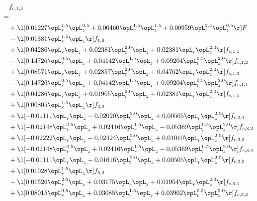 \begin{alignat}{2} 
\label{eq:f_13_1} 
& f_{c,1,3} \nonumber \\ 
 = \\ 
& + \l[  0.01227 \opL_r^{1.5} \opL_z^{0.5} +  0.00460 \opL_r^{1.5} \opL_z^{1.5} +  0.00959 \opL_r^{2.5} \opL_z^{0.5}  \r] F \nonumber \\ 
& - \l[  0.01381 \opL_r^{1.5} \opL_z  \r] f_{1,0} \nonumber \\ 
& + \l[  0.04286 \opL_r \opL_z +  0.02381 \opL_r^{2.0} \opL_z +  0.02381 \opL_r \opL_z^{2.0}  \r] f_{c,1,1} \nonumber \\ 
& - \l[  0.14726 \opL_r^{0.5} \opL_z +  0.04142 \opL_r^{1.5} \opL_z +  0.09204 \opL_r^{0.5} \opL_z^{2.0}  \r] f_{c,1,2} \nonumber \\ 
& + \l[  0.08571 \opL_r \opL_z +  0.02857 \opL_r^{2.0} \opL_z +  0.04762 \opL_r \opL_z^{2.0}  \r] f_{c,1,3} \nonumber \\ 
& - \l[  0.14726 \opL_r^{0.5} \opL_z +  0.04142 \opL_r^{1.5} \opL_z +  0.09204 \opL_r^{0.5} \opL_z^{2.0}  \r] f_{c,1,4} \nonumber \\ 
& + \l[  0.04286 \opL_r \opL_z +  0.01905 \opL_r^{2.0} \opL_z +  0.02381 \opL_r \opL_z^{2.0}  \r] f_{c,1,5} \nonumber \\ 
& + \l[  0.00805 \opL_r^{1.5} \opL_z  \r] f_{3,0} \nonumber \\ 
& + \l[  -0.01111 \opL_r \opL_z   -0.02020 \opL_r^{2.0} \opL_z +  0.00505 \opL_r \opL_z^{2.0}  \r] f_{c,3,1} \nonumber \\ 
& + \l[  -0.02148 \opL_r^{0.5} \opL_z +  0.02416 \opL_r^{1.5} \opL_z   -0.05369 \opL_r^{0.5} \opL_z^{2.0}  \r] f_{c,3,2} \nonumber \\ 
& + \l[  -0.02222 \opL_r \opL_z   -0.02424 \opL_r^{2.0} \opL_z +  0.01010 \opL_r \opL_z^{2.0}  \r] f_{c,3,3} \nonumber \\ 
& + \l[  -0.02148 \opL_r^{0.5} \opL_z +  0.02416 \opL_r^{1.5} \opL_z   -0.05369 \opL_r^{0.5} \opL_z^{2.0}  \r] f_{c,3,4} \nonumber \\ 
& + \l[  -0.01111 \opL_r \opL_z   -0.01616 \opL_r^{2.0} \opL_z +  0.00505 \opL_r \opL_z^{2.0}  \r] f_{c,3,5} \nonumber \\ 
& + \l[  0.01028 \opL_r^{1.5} \opL_z  \r] f_{5,0} \nonumber \\ 
& - \l[  0.01526 \opL_r^{2.0} \opL_z +  0.03175 \opL_r \opL_z +  0.01954 \opL_r \opL_z^{2.0}  \r] f_{c,5,1} \nonumber \\ 
& + \l[  0.08015 \opL_r^{0.5} \opL_z +  0.03085 \opL_r^{1.5} \opL_z +  0.03902 \opL_r^{0.5} \opL_z^{2.0}  \r] f_{c,5,2} \nonumber \\ 

\end{alignat}
